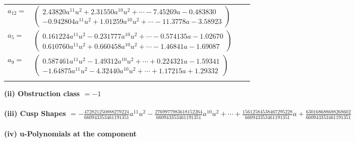 \documentclass[1p]{elsarticle_modified}
\theoremstyle{definition}
\begin{document}
\begin{tabular}{m{7pt} m{180pt} m{7pt} m{180pt} }
\flushright $a_{12}=$&$\begin{pmatrix}2.43820 a^{11} u^{2}+2.31550 a^{10} u^{2}+\cdots-7.45269 a-0.483830\\-0.942804 a^{11} u^{2}+1.01259 a^{10} u^{2}+\cdots-11.3778 a-3.58923\end{pmatrix}$ \\
\flushright $a_{5}=$&$\begin{pmatrix}0.161224 a^{11} u^{2}-0.231777 a^{10} u^{2}+\cdots-0.574135 a-1.02670\\0.610760 a^{11} u^{2}+0.660458 a^{10} u^{2}+\cdots-1.46841 a-1.69087\end{pmatrix}$ \\
\flushright $a_{9}=$&$\begin{pmatrix}0.587461 a^{11} u^{2}-1.49312 a^{10} u^{2}+\cdots+0.224321 a-1.59341\\-1.64875 a^{11} u^{2}-4.32440 a^{10} u^{2}+\cdots+1.17215 a+1.29332\end{pmatrix}$\\&\end{tabular}
\flushleft \textbf{(ii) Obstruction class $= -1$}\\~\\
\flushleft \textbf{(iii) Cusp Shapes $= -\frac{472821250888279224}{660943353461191351} a^{11} u^2-\frac{2769977983618152264}{660943353461191351} a^{10} u^2+\cdots+\frac{15612584538467295228}{660943353461191351} a+\frac{630168688688268602}{660943353461191351}$}\\~\\
\newpage\renewcommand{\arraystretch}{1}
\flushleft \textbf{(iv) u-Polynomials at the component}\newline \\
\end{document}
